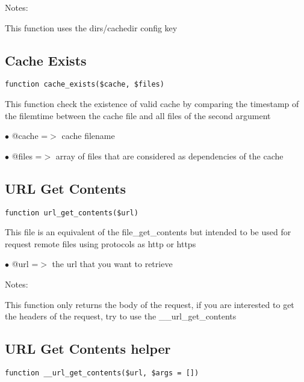 \documentclass[a4paper]{book}
\begin{document}
Notes:

This function uses the dirs/cachedir config key

\hypertarget{toc129}{}
\subsection{Cache Exists}

\begin{lstlisting}
function cache_exists($cache, $files)
\end{lstlisting}

This function check the existence of valid cache by comparing the timestamp
of the filemtime between the cache file and all files of the second argument

\begin{compactitem}
\item[\color{myblue}$\bullet$] @cache =$>$ cache filename
\item[\color{myblue}$\bullet$] @files =$>$ array of files that are considered as dependencies of the cache
\end{compactitem}

\hypertarget{toc130}{}
\subsection{URL Get Contents}

\begin{lstlisting}
function url_get_contents($url)
\end{lstlisting}

This file is an equivalent of the file\_get\_contents but intended to be used
for request remote files using protocols as http or https

\begin{compactitem}
\item[\color{myblue}$\bullet$] @url =$>$ the url that you want to retrieve
\end{compactitem}

Notes:

This function only returns the body of the request, if you are interested
to get the headers of the request, try to use the \_\_url\_get\_contents

\hypertarget{toc131}{}
\subsection{URL Get Contents helper}

\begin{lstlisting}
function __url_get_contents($url, $args = [])
\end{lstlisting}
\end{document}
